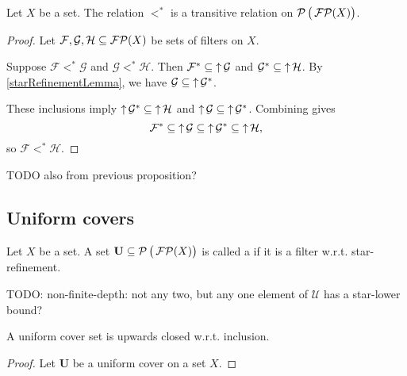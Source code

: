 \begin{proposition}
Let $X$ be a set. The relation $<^*$ is a transitive relation on $\operatorname{\mathcal{P}}\big(\operatorname{\mathcal{FP}}(X)\big)$.
\end{proposition}
\begin{proof}
Let $\mathcal{F}, \mathcal{G}, \mathcal{H}\subseteq \operatorname{\mathcal{FP}}(X)$ be sets of filters on $X$.

Suppose $\mathcal{F}<^* \mathcal{G}$ and $\mathcal{G} <^* \mathcal{H}$.
Then $\mathcal{F}^*\subseteq \operatorname{\uparrow} \mathcal{G}$ and $\mathcal{G}^* \subseteq \operatorname{\uparrow} \mathcal{H}$. By \ref{starRefinementLemma}, we have $\mathcal{G}\subseteq \operatorname{\uparrow} \mathcal{G}^*$.

These inclusions imply $\operatorname{\uparrow} \mathcal{G}^* \subseteq \operatorname{\uparrow} \mathcal{H}$ and $\operatorname{\uparrow} \mathcal{G} \subseteq \operatorname{\uparrow} \mathcal{G}^*$. Combining gives
\[ \mathcal{F}^* \subseteq \operatorname{\uparrow} \mathcal{G} \subseteq \operatorname{\uparrow} \mathcal{G}^* \subseteq \operatorname{\uparrow} \mathcal{H}, \]
so $\mathcal{F} <^* \mathcal{H}$.
\end{proof}
TODO also from previous proposition?

\subsection{Uniform covers}
\begin{definition}
Let $X$ be a set. A set $\mathbf{U}\subseteq \operatorname{\mathcal{P}}\big(\operatorname{\mathcal{FP}}(X)\big)$ is called a  if it is a filter w.r.t. star-refinement.
\end{definition}

TODO: non-finite-depth: not any two, but any one element of $\mathcal{U}$ has a star-lower bound?

\begin{lemma}
A uniform cover set is upwards closed w.r.t. inclusion.
\end{lemma}
\begin{proof}
Let $\mathbf{U}$ be a uniform cover on a set $X$. 
\end{proof}

